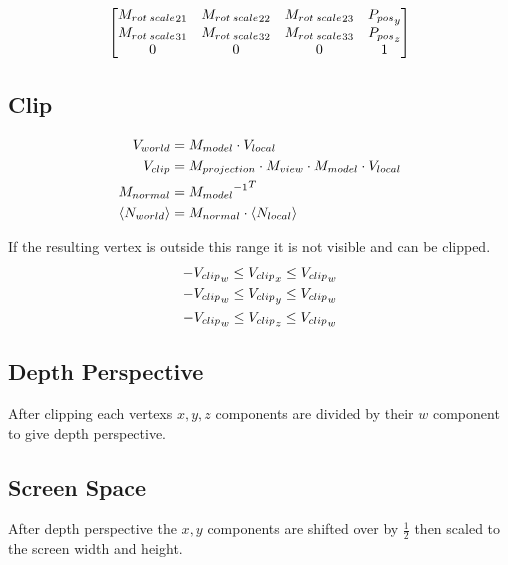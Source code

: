 \documentclass[12pt]{article}
\begin{document}
\begin{gather}
\begin{align}
\begin{bmatrix}
			{M_{rot\hspace{0.2em}scale}}_{21}&{M_{rot\hspace{0.2em}scale}}_{22}&{M_{rot\hspace{0.2em}scale}}_{23}&{P_{pos}}_y\\
			{M_{rot\hspace{0.2em}scale}}_{31}&{M_{rot\hspace{0.2em}scale}}_{32}&{M_{rot\hspace{0.2em}scale}}_{33}&{P_{pos}}_z\\
			0&0&0&1
		\end{bmatrix}
\end{align}\end{gather}

\subsection{Clip}


\begin{gather*}\begin{aligned}
		V_{world} &= M_{model} \cdot V_{local} \notag\\
		V_{clip} &= M_{projection} \cdot M_{view} \cdot M_{model} \cdot V_{local} \notag\\
		M_{normal} &= {{M_{model}}^{-1}}^T \notag\\
		\left\langle N_{world} \right\rangle &= M_{normal} \cdot \left\langle N_{local} \right\rangle \notag
\end{aligned}\end{gather*}

If the resulting vertex is outside this range it is not visible and can be clipped.
\begin{gather}
	-{V_{clip}}_w \leq {V_{clip}}_x \leq {V_{clip}}_w \label{clip-bounds}\\
	-{V_{clip}}_w \leq {V_{clip}}_y \leq {V_{clip}}_w \notag\\
	-{V_{clip}}_w \leq {V_{clip}}_z \leq {V_{clip}}_w \notag
\end{gather}

\subsection{Depth Perspective}
After clipping each vertexs $x,y,z$ components are divided by their $w$ component to give depth perspective. 

\subsection{Screen Space}
After depth perspective the $x,y$ components are shifted over by $\frac12$ then scaled to the screen width and height.
\end{document}
